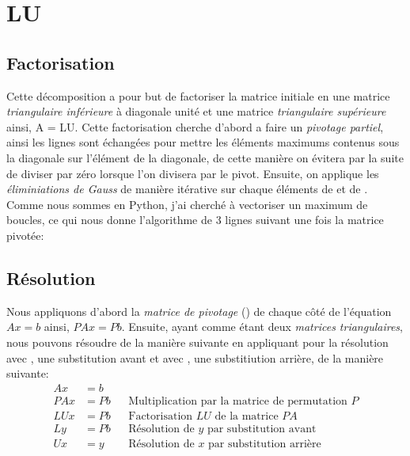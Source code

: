 \documentclass{article}[11pt]
\begin{document}
\mytitle
\section{LU}

\subsection{Factorisation}
Cette décomposition a pour but de factoriser la matrice initiale  en une matrice \textit{triangulaire inférieure}  à diagonale unité et une matrice \textit{triangulaire supérieure}  ainsi, {A = LU}.
Cette factorisation cherche d'abord a faire un \textit{pivotage partiel}, ainsi les lignes sont échangées pour mettre les éléments maximums contenus sous la diagonale sur l'élément de la diagonale, de cette manière on évitera par la suite de diviser par zéro lorsque l'on divisera par le pivot. Ensuite, on applique les \textit{éliminiations de Gauss} de manière itérative sur chaque éléments de  et de . Comme nous sommes en Python, j'ai cherché à vectoriser un maximum de boucles, ce qui nous donne l'algorithme de 3 lignes suivant une fois la matrice pivotée:


\subsection{Résolution}
Nous appliquons d'abord la \textit{matrice de pivotage} () de chaque côté de l'équation $Ax=b$ ainsi, $PAx=Pb$.
Ensuite, ayant  comme étant deux \textit{matrices triangulaires}, nous pouvons résoudre de la manière suivante en appliquant pour la résolution avec , une substitution avant et avec , une substitiution arrière, de la manière suivante:
\begin{align*}
     Ax&=b \\
    PAx& =Pb && \text{Multiplication par la matrice de permutation } P\\
    LUx& =Pb && \text{Factorisation } LU \text{ de la matrice } PA\\
    Ly& =Pb && \text{Résolution de } y \text{ par substitution avant}\\
    Ux&=y && \text{Résolution de } x \text{ par substitution arrière}
\end{align*}
\end{document}
